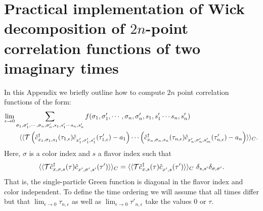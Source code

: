 

\section{Practical implementation of Wick decomposition of $2n$-point correlation functions of two imaginary times } \label{sec:wick}
\label{Wick_appendix}
In this Appendix we briefly  outline how to compute $2n$ point correlation functions   of the form: 
\begin{align}
\label{Time_dispalced_gen.eq}
	\lim_{\epsilon \rightarrow 0  } & \sum_{\sigma_1, \sigma'_1, \cdots, \sigma_n, \sigma'_n,  s_1, s'_1  \cdots s_n,  s'_n  }  f( \sigma_1, \sigma'_1, \cdots, \sigma_n, \sigma'_n,  s_1, s'_1  \cdots s_n,  s'_n ) 
	\nonumber    \\
         &  \, \, \, \,        \langle \langle {\cal T}  \left( \hat{c}^{\dagger}_{x_1,\sigma_1,s_1}(\tau_{1,\epsilon}) \hat{c}^{\phantom\dagger}_{x'_{1},\sigma'_1,s'_1}(\tau'_{1,\epsilon}) - a_1  \right)  \cdots 
	    \left( \hat{c}^{\dagger}_{x_n,\sigma_n,s_n}(\tau_{n,\epsilon}) \hat{c}^{\phantom\dagger}_{x'_{n},\sigma'_n,s'_m} (\tau'_{n,\epsilon}) - a_n  \right)   \rangle \rangle_C.
\end{align}
Here,  $ \sigma $ is a color  index and $s$ a flavor index such that 
\begin{equation}
	\langle \langle {\cal T}  \hat{c}^{\dagger}_{x,\sigma,s}(\tau) \hat{c}^{\phantom\dagger}_{x',\sigma',s'}(\tau')  \rangle \rangle_C  = 
	\langle \langle {\cal T}  \hat{c}^{\dagger}_{x,s}(\tau) \hat{c}^{\phantom\dagger}_{x',s}(\tau')  \rangle \rangle_C  \, \, \delta_{s,s'} \delta_{\sigma,\sigma'}.
\end{equation}
That is, the single-particle Green function is diagonal in the flavor index  and color  independent.   To  define the time ordering we will assume  that all times differ  but that $  \lim_{\epsilon \rightarrow 0 }    \tau_{n,\epsilon}  $   as well as $ \lim_{\epsilon \rightarrow 0 }    \tau'_{n,\epsilon} $  take the values $0$  or $\tau$.  
